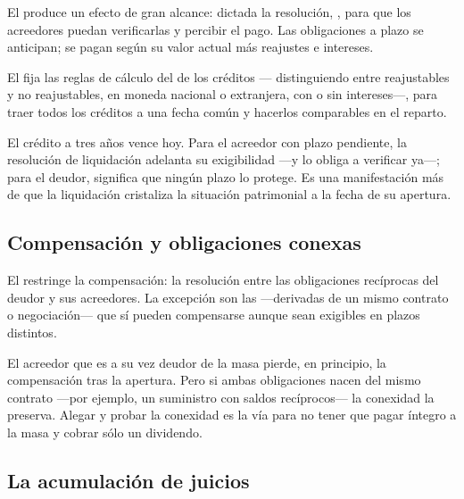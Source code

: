 El  produce un efecto de gran alcance: dictada la resolución, , para que los
acreedores puedan verificarlas y percibir el pago. Las obligaciones a plazo se anticipan; se
pagan según su valor actual más reajustes e intereses.

El  fija las reglas de cálculo del  de los créditos ---
distinguiendo entre reajustables y no reajustables, en moneda nacional o extranjera, con o sin
intereses---, para traer todos los créditos a una fecha común y hacerlos comparables en el
reparto.

\begin{foco}
El crédito a tres años vence hoy. Para el acreedor con plazo pendiente, la resolución de
liquidación adelanta su exigibilidad ---y lo obliga a verificar ya---; para el deudor, significa
que ningún plazo lo protege. Es una manifestación más de que la liquidación cristaliza la
situación patrimonial a la fecha de su apertura.
\end{foco}

\subsection{Compensación y obligaciones conexas}

El  restringe la compensación: la resolución  entre las obligaciones recíprocas del
deudor y sus acreedores. La excepción son las  ---derivadas de un
mismo contrato o negociación--- que sí pueden compensarse aunque sean exigibles en plazos
distintos.

\begin{practica}
El acreedor que es a su vez deudor de la masa pierde, en principio, la compensación tras la
apertura. Pero si ambas obligaciones nacen del mismo contrato ---por ejemplo, un suministro con
saldos recíprocos--- la conexidad la preserva. Alegar y probar la conexidad es la vía para no
tener que pagar íntegro a la masa y cobrar sólo un dividendo.
\end{practica}

\subsection{La acumulación de juicios}

